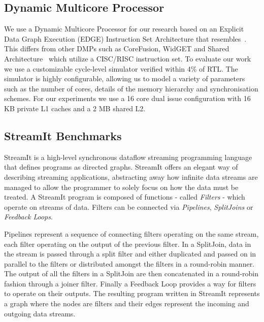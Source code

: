 \subsection{Dynamic Multicore Processor}

We use a Dynamic Multicore Processor for our research based on an Explicit Data Graph Execution (EDGE) Instruction Set Architecture that resembles~\cite{sibi2014}.
This differs from other DMPs such as CoreFusion, WidGET and Shared Architecture~\cite{ipek2007corefusion,watanabe2010widget,zhou2014sharingarch} which utilize a CISC/RISC instruction set.
To evaluate our work we use a customizable cycle-level simulator verified within 4\% of RTL.
The simulator is highly configurable, allowing us to model a variety of parameters such as the number of cores, details of the memory hierarchy and synchronisation schemes.
For our experiments we use a 16 core dual issue configuration with 16 KB private L1 caches and a 2 MB shared L2.

\subsection{StreamIt Benchmarks}

StreamIt is a high-level synchronous dataflow streaming programming language that defines programs as directed graphs.
StreamIt offers an elegant way of describing streaming applications, abstracting away how infinite data streams are managed to allow the programmer to solely focus on how the data must be treated.
A StreamIt program is composed of functions - called \textit{Filters} - which operate on streams of data.
Filters can be connected via \textit{Pipelines}, \textit{SplitJoins} or \textit{Feedback Loops}.

Pipelines represent a sequence of connecting filters operating on the same stream, each filter operating on the output of the previous filter.
In a SplitJoin, data in the stream is passed through a split filter and either duplicated and passed on in parallel to the filters or distributed amongst the filters in a round-robin manner.
The output of all the filters in a SplitJoin are then concatenated in a round-robin fashion through a joiner filter.
Finally a Feedback Loop provides a way for filters to operate on their outputs.
The resulting program written in StreamIt represents a graph where the nodes are filters and their edges represent the incoming and outgoing data streams.

